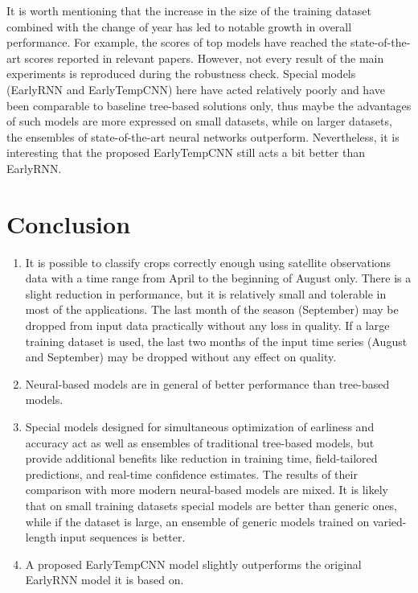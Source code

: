 \documentclass{article}
\begin{document}
It is worth mentioning that the increase in the size of the training dataset combined with the change of year has led to notable growth in overall performance. For example, the scores of top models have reached the state-of-the-art scores reported in relevant papers. However, not every result of the main experiments is reproduced during the robustness check. Special models (EarlyRNN and EarlyTempCNN) here have acted relatively poorly and have been comparable to baseline tree-based solutions only, thus maybe the advantages of such models are more expressed on small datasets, while on larger datasets, the ensembles of state-of-the-art neural networks outperform. Nevertheless, it is interesting that the proposed EarlyTempCNN still acts a bit better than EarlyRNN.

\section{Conclusion}

\begin{enumerate}
    \item It is possible to classify crops correctly enough using satellite observations data with a time range from April to the beginning of August only. There is a slight reduction in performance, but it is relatively small and tolerable in most of the applications. The last month of the season (September) may be dropped from input data practically without any loss in quality. If a large training dataset is used, the last two months of the input time series (August and September) may be dropped without any effect on quality.
    \item Neural-based models are in general of better performance than tree-based models.
    \item Special models designed for simultaneous optimization of earliness and accuracy act as well as ensembles of traditional tree-based models, but provide additional benefits like reduction in training time, field-tailored predictions, and real-time confidence estimates. The results of their comparison with more modern neural-based models are mixed. It is likely that on small training datasets special models are better than generic ones, while if the dataset is large, an ensemble of generic models trained on varied-length input sequences is better.
    \item A proposed EarlyTempCNN model slightly outperforms the original EarlyRNN model it is based on.
\end{enumerate}

\newpage

\printbibliography
\end{document}
